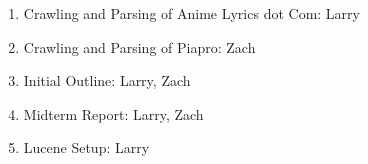 \documentclass{acm} %
\begin{document}
\begin{CJK}{UTF8}{zhsong}
\begin{enumerate}
\item Crawling and Parsing of Anime Lyrics dot Com: Larry
\item Crawling and Parsing of Piapro: Zach
\item Initial Outline: Larry, Zach
\item Midterm Report: Larry, Zach
\item Lucene Setup: Larry
\end{enumerate}



\end{CJK}
\end{document}
